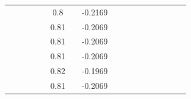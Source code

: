 \documentclass[a4paper,12pt]{article}
\begin{document}
\begin{landscape}
\begin{table}[]
\begin{tabular}{|c|c|c|c|c|c|c|c|c|c|c|c|c|c|c|c|c|}
                     &                           &                         &                         &                        & 0.8  &                         & -0.2169 &                          &                          &                           &                           &                        &                           &                           &                            &                           \\ \cline{6-6} \cline{8-8}
                     &                           &                         &                         &                        & 0.81 &                         & -0.2069 &                          &                          &                           &                           &                        &                           &                           &                            &                           \\ \cline{6-6} \cline{8-8}
                     &                           &                         &                         &                        & 0.81 &                         & -0.2069 &                          &                          &                           &                           &                        &                           &                           &                            &                           \\ \cline{6-6} \cline{8-8}
                     &                           &                         &                         &                        & 0.81 &                         & -0.2069 &                          &                          &                           &                           &                        &                           &                           &                            &                           \\ \cline{6-6} \cline{8-8}
                     &                           &                         &                         &                        & 0.82 &                         & -0.1969 &                          &                          &                           &                           &                        &                           &                           &                            &                           \\ \cline{6-6} \cline{8-8}
                     &                           &                         &                         &                        & 0.81 &                         & -0.2069 &                          &                          &                           &                           &                        &                           &                           &                            &                           \\ \cline{4-6} \cline{8-8} \cline{10-12} \cline{14-15} \cline{17-17} 

\end{tabular}
\end{table}
\end{landscape}
\end{document}
